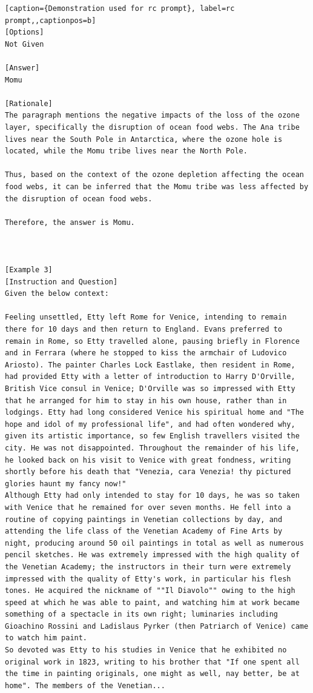 \begin{lstlisting}[caption={Demonstration used for rc prompt}, label=rc prompt,,captionpos=b]
[Options]
Not Given

[Answer]
Momu

[Rationale]
The paragraph mentions the negative impacts of the loss of the ozone layer, specifically the disruption of ocean food webs. The Ana tribe lives near the South Pole in Antarctica, where the ozone hole is located, while the Momu tribe lives near the North Pole.

Thus, based on the context of the ozone depletion affecting the ocean food webs, it can be inferred that the Momu tribe was less affected by the disruption of ocean food webs. 

Therefore, the answer is Momu.



[Example 3]
[Instruction and Question]
Given the below context:

Feeling unsettled, Etty left Rome for Venice, intending to remain there for 10 days and then return to England. Evans preferred to remain in Rome, so Etty travelled alone, pausing briefly in Florence and in Ferrara (where he stopped to kiss the armchair of Ludovico Ariosto). The painter Charles Lock Eastlake, then resident in Rome, had provided Etty with a letter of introduction to Harry D'Orville, British Vice consul in Venice; D'Orville was so impressed with Etty that he arranged for him to stay in his own house, rather than in lodgings. Etty had long considered Venice his spiritual home and "The hope and idol of my professional life", and had often wondered why, given its artistic importance, so few English travellers visited the city. He was not disappointed. Throughout the remainder of his life, he looked back on his visit to Venice with great fondness, writing shortly before his death that "Venezia, cara Venezia! thy pictured glories haunt my fancy now!"
Although Etty had only intended to stay for 10 days, he was so taken with Venice that he remained for over seven months. He fell into a routine of copying paintings in Venetian collections by day, and attending the life class of the Venetian Academy of Fine Arts by night, producing around 50 oil paintings in total as well as numerous pencil sketches. He was extremely impressed with the high quality of the Venetian Academy; the instructors in their turn were extremely impressed with the quality of Etty's work, in particular his flesh tones. He acquired the nickname of ""Il Diavolo"" owing to the high speed at which he was able to paint, and watching him at work became something of a spectacle in its own right; luminaries including Gioachino Rossini and Ladislaus Pyrker (then Patriarch of Venice) came to watch him paint. 
So devoted was Etty to his studies in Venice that he exhibited no original work in 1823, writing to his brother that "If one spent all the time in painting originals, one might as well, nay better, be at home". The members of the Venetian...


\end{lstlisting}
